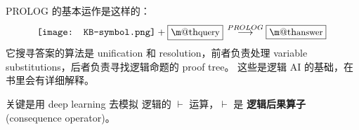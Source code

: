 \documentclass[orivec]{llncs}
\makeatletter
\newcommand*\KB{\vcenter{\hbox{\texttt{[image: KB-symbol.png]}}}}
\renewcommand{\boxed}[1]{\fbox{\m@th$\displaystyle\scalebox{0.9}{#1}$} \,}
\makeatother
\begin{document}
PROLOG 的基本运作是这样的：
\begin{equation}
\KB + \boxed{query} \stackrel{PROLOG}{\longrightarrow} \boxed{answer}
\end{equation}
它搜寻答案的算法是 unification 和 resolution，前者负责处理 variable substitutions，后者负责寻找逻辑命题的 proof tree。  这些是逻辑 AI 的基础，在书里会有详细解释。

关键是用 deep learning 去模拟 逻辑的 $\vdash$ 运算，$\vdash$ 是 \textbf{逻辑后果算子} (consequence operator)。 




\end{document}
